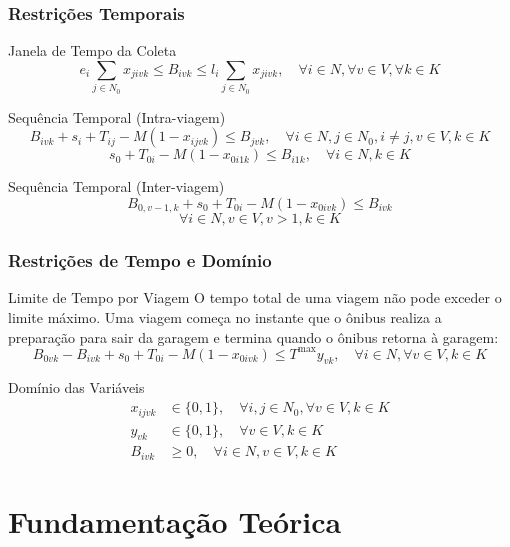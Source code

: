 \documentclass[10pt]{beamer}
\begin{document}
\begin{frame}
\frametitle{Restrições Temporais}
\begin{block}{Janela de Tempo da Coleta}
$$e_i \sum_{j \in N_0} x_{jivk} \leq B_{ivk} \leq l_i \sum_{j \in N_0} x_{jivk}, \quad \forall i \in N, \forall v \in V, \forall k \in K$$
\end{block}

\begin{block}{Sequência Temporal (Intra-viagem)}
$$B_{ivk} + s_i + T_{ij} - M(1 - x_{ijvk}) \leq B_{jvk}, \quad \forall i \in N, j \in N_0, i \neq j, v \in V, k \in K$$
$$ s_0 + T_{0i} - M (1 - x_{0i1k}) \leq B_{i1k}, \quad \forall i \in N, k \in K$$
\end{block}

\begin{block}{Sequência Temporal (Inter-viagem)}
$$B_{0,v-1,k} + s_0 + T_{0i} - M(1 - x_{0ivk}) \leq B_{ivk}$$
$$\forall i \in N, v \in V, v > 1, k \in K$$
\end{block}
\end{frame}

\begin{frame}
\frametitle{Restrições de Tempo e Domínio}
\begin{block}{Limite de Tempo por Viagem}
O tempo total de uma viagem não pode exceder o limite máximo. Uma viagem começa no instante que o ônibus realiza a preparação para sair da garagem e termina quando o ônibus retorna à garagem:
$$ B_{0vk} - B_{ivk} + s_0 + T_{0i} - M (1-x_{0ivk}) \leq T^{\max} y_{vk}, \quad \forall i \in N, \forall v \in V, k \in K$$
\end{block}

\begin{block}{Domínio das Variáveis}
\begin{align}
x_{ijvk} &\in \{0, 1\}, \quad \forall i,j \in N_0, \forall v \in V, k \in K \\
y_{vk} &\in \{0, 1\}, \quad \forall v \in V, k \in K \\
B_{ivk} &\geq 0, \quad \forall i \in N, v \in V, k \in K
\end{align}
\end{block}
\end{frame}

\section{Fundamentação Teórica}
\end{document}
